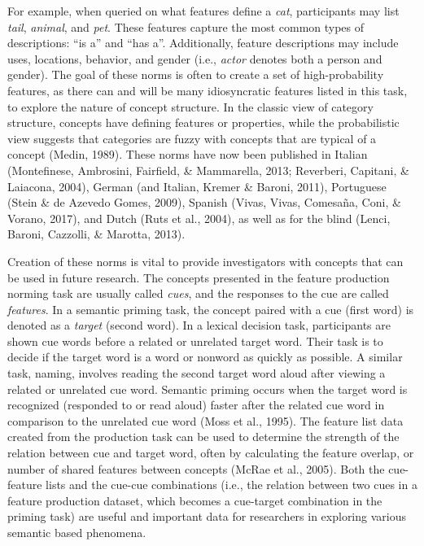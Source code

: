 \documentclass[english,,man]{apa6}
\theoremstyle{definition}
\theoremstyle{definition}
\theoremstyle{definition}
\theoremstyle{remark}
\begin{document}
For example, when queried on what features define a \emph{cat},
participants may list \emph{tail}, \emph{animal}, and \emph{pet}. These
features capture the most common types of descriptions: \enquote{is a}
and \enquote{has a}. Additionally, feature descriptions may include
uses, locations, behavior, and gender (i.e., \emph{actor} denotes both a
person and gender). The goal of these norms is often to create a set of
high-probability features, as there can and will be many idiosyncratic
features listed in this task, to explore the nature of concept
structure. In the classic view of category structure, concepts have
defining features or properties, while the probabilistic view suggests
that categories are fuzzy with concepts that are typical of a concept
(Medin, 1989). These norms have now been published in Italian
(Montefinese, Ambrosini, Fairfield, \& Mammarella, 2013; Reverberi,
Capitani, \& Laiacona, 2004), German (and Italian, Kremer \& Baroni,
2011), Portuguese (Stein \& de Azevedo Gomes, 2009), Spanish (Vivas,
Vivas, Comesaña, Coni, \& Vorano, 2017), and Dutch (Ruts et al., 2004),
as well as for the blind (Lenci, Baroni, Cazzolli, \& Marotta, 2013).

Creation of these norms is vital to provide investigators with concepts
that can be used in future research. The concepts presented in the
feature production norming task are usually called \emph{cues}, and the
responses to the cue are called \emph{features}. In a semantic priming
task, the concept paired with a cue (first word) is denoted as a
\emph{target} (second word). In a lexical decision task, participants
are shown cue words before a related or unrelated target word. Their
task is to decide if the target word is a word or nonword as quickly as
possible. A similar task, naming, involves reading the second target
word aloud after viewing a related or unrelated cue word. Semantic
priming occurs when the target word is recognized (responded to or read
aloud) faster after the related cue word in comparison to the unrelated
cue word (Moss et al., 1995). The feature list data created from the
production task can be used to determine the strength of the relation
between cue and target word, often by calculating the feature overlap,
or number of shared features between concepts (McRae et al., 2005). Both
the cue-feature lists and the cue-cue combinations (i.e., the relation
between two cues in a feature production dataset, which becomes a
cue-target combination in the priming task) are useful and important
data for researchers in exploring various semantic based phenomena.
\end{document}
